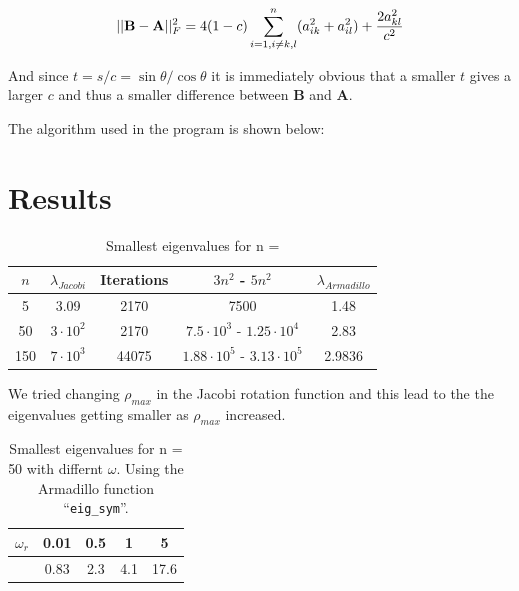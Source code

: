 \documentclass{article} %
\begin{document}
\begin{equation}
	||{\bf B}-{\bf A}||_F^2=4(1-c)\sum_{i=1,i\ne k,l}^n(a_{ik}^2+a_{il}^2) +\frac{2a_{kl}^2}{c^2}
	\label{eq:diffAB}
\end{equation}	 

And since $t=s/c=\sin\theta /\cos\theta$ it is immediately obvious that a smaller  $t$ gives a larger $c$ and thus a smaller difference between $\mathbf{B}$ and $\mathbf{A}$.

The algorithm used in the program is shown below:
\begin{adjustwidth}{1.5cm}{1.5cm}
	 
\end{adjustwidth}


\section{Results}

\begin{table}[h]
	\caption{Smallest eigenvalues for n = }
	\centering
\begin{tabular}{| c | c | c | c | c |}
	\hline
	$n$ & $\lambda_{Jacobi}$ & Iterations & $3n^2$ - $5n^2$ & $\lambda_{Armadillo}$ \\
	\hline
	5 & 3.09 & 2170 & 7500 & 1.48 \\
	\hline
	50 & $3 \cdot 10^2$ & 2170 & $7.5 \cdot 10^3$ - $1.25 \cdot 10^4$ & 2.83 \\
	\hline
	150 & $7 \cdot 10^3$ & 44075 & $1.88 \cdot 10^5$ - $3.13 \cdot 10^5$ & 2.9836 \\
	\hline
\end{tabular}
	\label{table:eigen}
\end{table}

We tried changing $\rho_{max}$ in the Jacobi rotation function and this lead to the the eigenvalues getting smaller as $\rho_{max}$ increased.

\begin{table}[h]
	\caption{Smallest eigenvalues for n = 50 with differnt $\omega$. Using the Armadillo function ``\texttt{eig\_sym}''.}
	\centering
\begin{tabular}{| c | c | c | c | c |}
	\hline
	$\omega_r$ & 0.01 & 0.5 & 1 & 5 \\
	\hline
	 & 0.83 & 2.3 & 4.1 & 17.6 \\
	\hline
\end{tabular}
	\label{table:eigen2}
\end{table}
\end{document}

